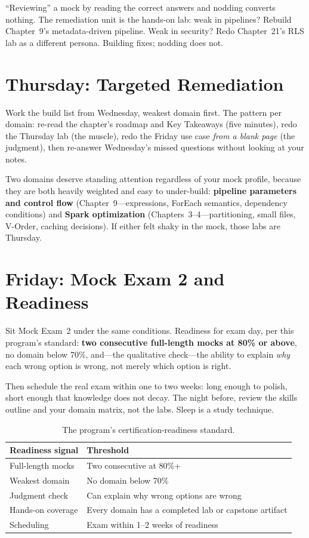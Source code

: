 \begin{pitfall}
``Reviewing'' a mock by reading the correct answers and nodding converts nothing. The remediation unit is the hands-on lab: weak in pipelines? Rebuild Chapter~9's metadata-driven pipeline. Weak in security? Redo Chapter~21's RLS lab as a different persona. Building fixes; nodding does not.
\end{pitfall}

\section{Thursday: Targeted Remediation}
Work the build list from Wednesday, weakest domain first. The pattern per domain: re-read the chapter's roadmap and Key Takeaways (five minutes), redo the Thursday lab (the muscle), redo the Friday use case \emph{from a blank page} (the judgment), then re-answer Wednesday's missed questions without looking at your notes.

Two domains deserve standing attention regardless of your mock profile, because they are both heavily weighted and easy to under-build: \textbf{pipeline parameters and control flow} (Chapter~9---expressions, ForEach semantics, dependency conditions) and \textbf{Spark optimization} (Chapters~3--4---partitioning, small files, V-Order, caching decisions). If either felt shaky in the mock, those labs are Thursday.

\section{Friday: Mock Exam 2 and Readiness}
Sit Mock Exam~2 under the same conditions. Readiness for exam day, per this program's standard: \textbf{two consecutive full-length mocks at 80\% or above}, no domain below 70\%, and---the qualitative check---the ability to explain \emph{why} each wrong option is wrong, not merely which option is right.

Then schedule the real exam within one to two weeks: long enough to polish, short enough that knowledge does not decay. The night before, review the skills outline and your domain matrix, not the labs. Sleep is a study technique.

\begin{table}[H]
\centering
\small
\begin{tabular}{@{}p{5.4cm}p{8.0cm}@{}}
\toprule
\textbf{Readiness signal} & \textbf{Threshold} \\
\midrule
Full-length mocks & Two consecutive at 80\%+ \\
Weakest domain & No domain below 70\% \\
Judgment check & Can explain why wrong options are wrong \\
Hands-on coverage & Every domain has a completed lab or capstone artifact \\
Scheduling & Exam within 1--2 weeks of readiness \\
\bottomrule
\end{tabular}
\caption{The program's certification-readiness standard.}
\label{tab:chapter24-readiness}
\end{table}

